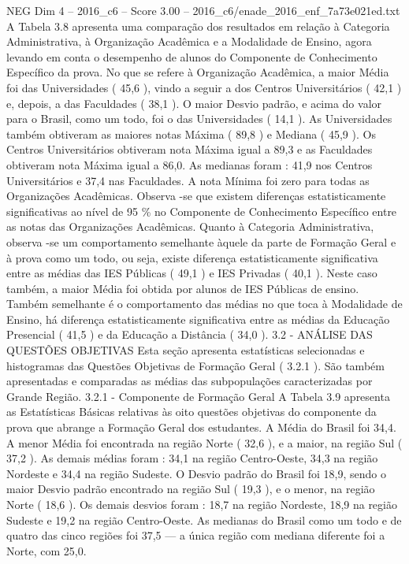 \begin{textsample}{NEG Dim 4 – 2016\_c6 – Score 3.00 – 2016\_c6/enade\_2016\_enf\_7a73e021ed.txt}
A Tabela 3.8 apresenta uma comparação dos resultados em relação à Categoria Administrativa, à Organização Acadêmica e a Modalidade de Ensino, agora levando em conta o desempenho de alunos do Componente de Conhecimento Específico da prova.
No que se refere à Organização Acadêmica, a maior Média foi das Universidades ( 45,6 ), vindo a seguir a dos Centros Universitários ( 42,1 ) e, depois, a das Faculdades ( 38,1 ).
O maior Desvio padrão, e acima do valor para o Brasil, como um todo, foi o das Universidades ( 14,1 ).
As Universidades também obtiveram as maiores notas Máxima ( 89,8 ) e Mediana ( 45,9 ).
Os Centros Universitários obtiveram nota Máxima igual a 89,3 e as Faculdades obtiveram nota Máxima igual a 86,0.
As medianas foram : 41,9 nos Centros Universitários e 37,4 nas Faculdades.
A nota Mínima foi zero para todas as Organizações Acadêmicas.
Observa -se que existem diferenças estatisticamente significativas ao nível de 95 \% no Componente de Conhecimento Específico entre as notas das Organizações Acadêmicas.
Quanto à Categoria Administrativa, observa -se um comportamento semelhante àquele da parte de Formação Geral e à prova como um todo, ou seja, existe diferença estatisticamente significativa entre as médias das IES Públicas ( 49,1 ) e IES Privadas ( 40,1 ).
Neste caso também, a maior Média foi obtida por alunos de IES Públicas de ensino.
Também semelhante é o comportamento das médias no que toca à Modalidade de Ensino, há diferença estatisticamente significativa entre as médias da Educação Presencial ( 41,5 ) e da Educação a Distância ( 34,0 ). 3.2 - ANÁLISE DAS QUESTÕES OBJETIVAS Esta seção apresenta estatísticas selecionadas e histogramas das Questões Objetivas de Formação Geral ( 3.2.1 ).
São também apresentadas e comparadas as médias das subpopulações caracterizadas por Grande Região. 3.2.1 - Componente de Formação Geral A Tabela 3.9 apresenta as Estatísticas Básicas relativas às oito questões objetivas do componente da prova que abrange a Formação Geral dos estudantes.
A Média do Brasil foi 34,4.
A menor Média foi encontrada na região Norte ( 32,6 ), e a maior, na região Sul ( 37,2 ).
As demais médias foram : 34,1 na região Centro-Oeste, 34,3 na região Nordeste e 34,4 na região Sudeste.
O Desvio padrão do Brasil foi 18,9, sendo o maior Desvio padrão encontrado na região Sul ( 19,3 ), e o menor, na região Norte ( 18,6 ).
Os demais desvios foram : 18,7 na região Nordeste, 18,9 na região Sudeste e 19,2 na região Centro-Oeste.
As medianas do Brasil como um todo e de quatro das cinco regiões foi 37,5 — a única região com mediana diferente foi a Norte, com 25,0.

\end{textsample}
